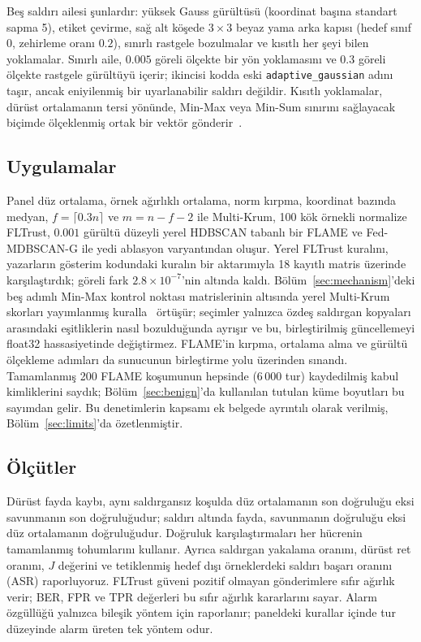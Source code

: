 \documentclass[journal]{IEEEtran}
\newcommand{\method}{Fed-MDBSCAN-G}
\begin{document}
Beş saldırı ailesi şunlardır: yüksek Gauss gürültüsü (koordinat başına standart sapma 5), etiket çevirme, sağ alt köşede $3\times3$ beyaz yama arka kapısı (hedef sınıf 0, zehirleme oranı $0.2$), sınırlı rastgele bozulmalar ve kısıtlı her şeyi bilen yoklamalar. Sınırlı aile, $0.005$ göreli ölçekte bir yön yoklamasını ve $0.3$ göreli ölçekte rastgele gürültüyü içerir; ikincisi kodda eski \texttt{adaptive\_gaussian} adını taşır, ancak eniyilenmiş bir uyarlanabilir saldırı değildir. Kısıtlı yoklamalar, dürüst ortalamanın tersi yönünde, Min-Max veya Min-Sum sınırını sağlayacak biçimde ölçeklenmiş ortak bir vektör gönderir~\cite{shejwalkar2021}.

\subsection{Uygulamalar}\label{sec:fidelity}
Panel düz ortalama, örnek ağırlıklı ortalama, norm kırpma, koordinat bazında medyan, $f=\lceil0.3n\rceil$ ve $m=n-f-2$ ile Multi-Krum, 100 kök örnekli normalize FLTrust, $0.001$ gürültü düzeyli yerel HDBSCAN tabanlı bir FLAME ve \method{} ile yedi ablasyon varyantından oluşur. Yerel FLTrust kuralını, yazarların gösterim kodundaki kuralın bir aktarımıyla 18 kayıtlı matris üzerinde karşılaştırdık; göreli fark $2.8\times10^{-7}$'nin altında kaldı. Bölüm~\ref{sec:mechanism}'deki beş adımlı Min-Max kontrol noktası matrislerinin altısında yerel Multi-Krum skorları yayımlanmış kuralla~\cite{blanchard2017} örtüşür; seçimler yalnızca özdeş saldırgan kopyaları arasındaki eşitliklerin nasıl bozulduğunda ayrışır ve bu, birleştirilmiş güncellemeyi float32 hassasiyetinde değiştirmez. FLAME'in kırpma, ortalama alma ve gürültü ölçekleme adımları da sunucunun birleştirme yolu üzerinden sınandı. Tamamlanmış 200 FLAME koşumunun hepsinde (6\,000 tur) kaydedilmiş kabul kimliklerini saydık; Bölüm~\ref{sec:benign}'da kullanılan tutulan küme boyutları bu sayımdan gelir. Bu denetimlerin kapsamı ek belgede ayrıntılı olarak verilmiş, Bölüm~\ref{sec:limits}'da özetlenmiştir.

\subsection{Ölçütler}
Dürüst fayda kaybı, aynı saldırgansız koşulda düz ortalamanın son doğruluğu eksi savunmanın son doğruluğudur; saldırı altında fayda, savunmanın doğruluğu eksi düz ortalamanın doğruluğudur. Doğruluk karşılaştırmaları her hücrenin tamamlanmış tohumlarını kullanır. Ayrıca saldırgan yakalama oranını, dürüst ret oranını, $J$ değerini ve tetiklenmiş hedef dışı örneklerdeki saldırı başarı oranını (ASR) raporluyoruz. FLTrust güveni pozitif olmayan gönderimlere sıfır ağırlık verir; BER, FPR ve TPR değerleri bu sıfır ağırlık kararlarını sayar. Alarm özgüllüğü yalnızca bileşik yöntem için raporlanır; paneldeki kurallar içinde tur düzeyinde alarm üreten tek yöntem odur.
\end{document}
